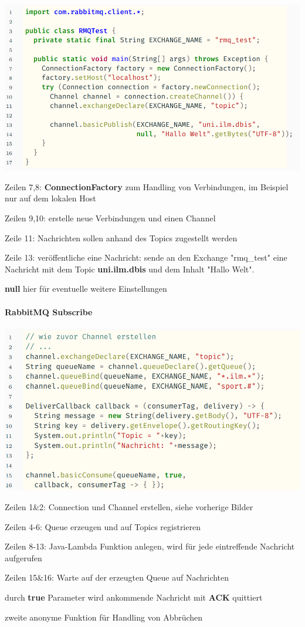 \documentclass[10pt]{article}
\begin{document}
\begin{center}
  \includegraphics[width=0.4\linewidth]{Assets/Programmierparadigmen-code-snippet-89}
\end{center}
\begin{itemize*}
  \item Zeilen 7,8: \textbf{ConnectionFactory} zum Handling von Verbindungen, im Beispiel nur auf dem lokalen Host
  \item Zeilen 9,10: erstelle neue Verbindungen und einen Channel
  \item Zeile 11: Nachrichten sollen anhand des Topics zugestellt werden
  \item Zeile 13: veröffentliche eine Nachricht: sende an den Exchange "rmq\_test" eine Nachricht mit dem Topic \textbf{uni.ilm.dbis} und dem Inhalt "Hallo Welt".
  \begin{itemize*}
    \item \textbf{null} hier für eventuelle weitere Einstellungen
  \end{itemize*}
\end{itemize*}

\paragraph{RabbitMQ Subscribe}

\begin{center}
  \includegraphics[width=0.4\linewidth]{Assets/Programmierparadigmen-code-snippet-90}
\end{center}
\begin{itemize*}
  \item Zeilen 1\&2: Connection und Channel erstellen, siehe vorherige Bilder
  \item Zeilen 4-6: Queue erzeugen und auf Topics registrieren
  \item Zeilen 8-13: Java-Lambda Funktion anlegen, wird für jede eintreffende Nachricht aufgerufen
  \item Zeilen 15\&16: Warte auf der erzeugten Queue auf Nachrichten
  \begin{itemize*}
    \item durch \textbf{true} Parameter wird ankommende Nachricht mit \textbf{ACK} quittiert
    \item zweite anonyme Funktion für Handling von Abbrüchen
  \end{itemize*}
\end{itemize*}
\end{document}
